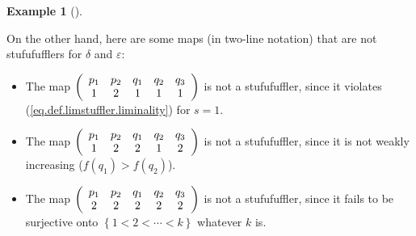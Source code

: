 \documentclass[numbers=enddot,12pt,final,onecolumn,notitlepage]{scrartcl}%
\theoremstyle{definition}
\newtheorem{exam}[theo]{Example}
\newenvironment{example}[1][]
{\begin{exam}[#1]\begin{leftbar}}
{\end{leftbar}\end{exam}}
\begin{document}
\begin{example}
On the other hand, here are some maps (in two-line notation) that are not
stufufufflers for $\delta$ and $\varepsilon$:

\begin{itemize}
\item The map $\left(
\begin{array}
[c]{ccccc}%
p_{1} & p_{2} & q_{1} & q_{2} & q_{3}\\
1 & 2 & 1 & 1 & 1
\end{array}
\right)  $ is not a stufufuffler, since it violates
(\ref{eq.def.limstuffler.liminality}) for $s=1$.

\item The map $\left(
\begin{array}
[c]{ccccc}%
p_{1} & p_{2} & q_{1} & q_{2} & q_{3}\\
1 & 2 & 2 & 1 & 2
\end{array}
\right)  $ is not a stufufuffler, since it is not weakly increasing ($f\left(
q_{1}\right)  >f\left(  q_{2}\right)  $).

\item The map $\left(
\begin{array}
[c]{ccccc}%
p_{1} & p_{2} & q_{1} & q_{2} & q_{3}\\
2 & 2 & 2 & 2 & 2
\end{array}
\right)  $ is not a stufufuffler, since it fails to be surjective onto
$\left\{  1<2<\cdots<k\right\}  $ whatever $k$ is.
\end{itemize}


\end{example}
\end{document}
